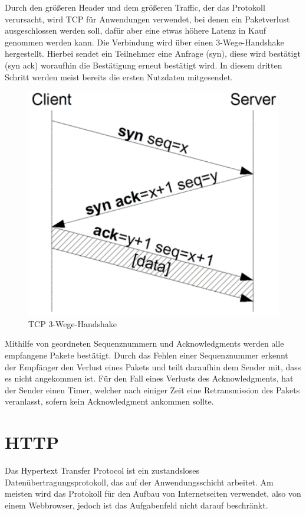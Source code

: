 Durch den größeren Header und dem größeren Traffic, der das Protokoll verursacht, wird TCP für Anwendungen verwendet, bei denen ein Paketverlust ausgeschlossen werden soll, dafür aber eine etwas höhere Latenz in Kauf genommen werden kann. 
Die Verbindung wird über einen 3-Wege-Handshake hergestellt. Hierbei sendet ein Teilnehmer eine Anfrage (syn), diese wird bestätigt (syn ack) woraufhin die Bestätigung erneut bestätigt wird. In diesem dritten Schritt werden meist bereits die ersten Nutzdaten mitgesendet.
\begin{figure}
	\includegraphics[width=\textwidth]{images/TCP_3wayhandshake.pdf}
	\caption{TCP 3-Wege-Handshake}
	\label{fig:tcp_3wayhandshake}
\end{figure}

Mithilfe von geordneten Sequenznummern und Acknowledgments werden alle empfangene Pakete bestätigt. Durch das Fehlen einer Sequenznummer erkennt der Empfänger den Verlust eines Pakets und teilt daraufhin dem Sender mit, dass es nicht angekommen ist. Für den Fall eines Verlusts des Acknowledgments, hat der Sender einen Timer, welcher nach einiger Zeit eine Retransmission des Pakets veranlasst, sofern kein Acknowledgment ankommen sollte.


\section{HTTP}

Das Hypertext Transfer Protocol ist ein zustandsloses Datenübertragungsprotokoll, das auf der Anwendungsschicht arbeitet. Am meisten wird das Protokoll für den Aufbau von Internetseiten verwendet, also von einem Webbrowser, jedoch ist das Aufgabenfeld nicht darauf beschränkt.

